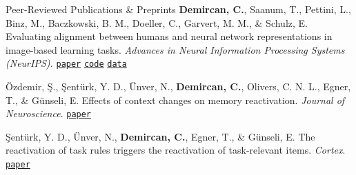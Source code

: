 \begin{rubric}{Peer-Reviewed Publications \& Preprints}
    \entry*[2024]
    \textbf{Demircan, C.}, Saanum, T., Pettini, L., Binz, M., Baczkowski, B. M., Doeller, C., Garvert, M. M., \& Schulz, E. Evaluating alignment between humans and neural network representations in image-based learning tasks. \emph{Advances in Neural Information Processing Systems (NeurIPS).} {\href{https://openreview.net/forum?id=8i6px5W1Rf&referrer=%5Bthe%20profile%20of%20Eric%20Schulz%5D(%2Fprofile%3Fid%3D~Eric_Schulz1)}{\textcolor{MarkerColour}{\lbrack\texttt{paper}\rbrack}}} {\href{https://github.com/candemircan/naturalcogsci}{\textcolor{MarkerColour}{\lbrack\texttt{code}\rbrack}}} {\href{https://osf.io/h3t52/}{\textcolor{MarkerColour}{\lbrack\texttt{data}\rbrack}}} \par

    \entry*[2024]
    Özdemir, Ş., Şentürk, Y. D., Ünver, N., \textbf{Demircan, C.}, Olivers, C. N. L., Egner, T., \& Günseli, E. Effects of context changes on memory reactivation. \emph{Journal of Neuroscience}. {\href{https://www.jneurosci.org/content/44/36/e2096232024.abstract}{\textcolor{MarkerColour}{\lbrack\texttt{paper}\rbrack}}} \par

    \entry*[2024]
    Şentürk, Y. D., Ünver, N., \textbf{Demircan, C.}, Egner, T., \& Günseli, E. The reactivation of task rules triggers the reactivation of task-relevant items. \emph{Cortex}. {\href{https://www.sciencedirect.com/science/article/abs/pii/S0010945223002903}{\textcolor{MarkerColour}{\lbrack\texttt{paper}\rbrack}}} \par


\end{rubric}